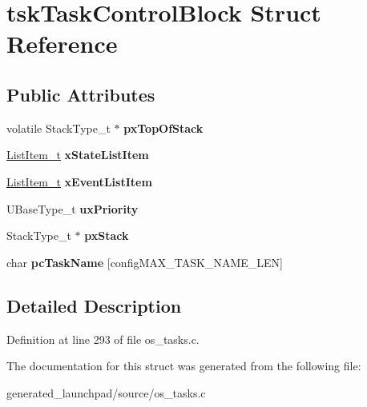 \hypertarget{structtskTaskControlBlock}{}\section{tsk\+Task\+Control\+Block Struct Reference}
\label{structtskTaskControlBlock}
\subsection*{Public Attributes}
\begin{DoxyCompactItemize}
\item 
\mbox{\label{structtskTaskControlBlock_a429a186c7f8e34aba1eef5e12d215b90}} 
volatile Stack\+Type\+\_\+t $\ast$ {\bfseries px\+Top\+Of\+Stack}
\item 
\mbox{\label{structtskTaskControlBlock_a16e0d20425d53ac78537e1fdb8834cf6}} 
\mbox{\hyperlink{structxLIST__ITEM}{List\+Item\+\_\+t}} {\bfseries x\+State\+List\+Item}
\item 
\mbox{\label{structtskTaskControlBlock_a1a1612b6081a13683808284d93a9b28f}} 
\mbox{\hyperlink{structxLIST__ITEM}{List\+Item\+\_\+t}} {\bfseries x\+Event\+List\+Item}
\item 
\mbox{\label{structtskTaskControlBlock_a79187811e3d2a15595942e3b44237d85}} 
U\+Base\+Type\+\_\+t {\bfseries ux\+Priority}
\item 
\mbox{\label{structtskTaskControlBlock_a9a0d71a9f95dd0609f9911d9efd79134}} 
Stack\+Type\+\_\+t $\ast$ {\bfseries px\+Stack}
\item 
\mbox{\label{structtskTaskControlBlock_a67d61291794f38afb5be5132078bc24f}} 
char {\bfseries pc\+Task\+Name} \mbox{[}config\+M\+A\+X\+\_\+\+T\+A\+S\+K\+\_\+\+N\+A\+M\+E\+\_\+\+L\+EN\mbox{]}
\end{DoxyCompactItemize}


\subsection{Detailed Description}


Definition at line 293 of file os\+\_\+tasks.\+c.



The documentation for this struct was generated from the following file\+:\begin{DoxyCompactItemize}
\item 
generated\+\_\+launchpad/source/os\+\_\+tasks.\+c\end{DoxyCompactItemize}
